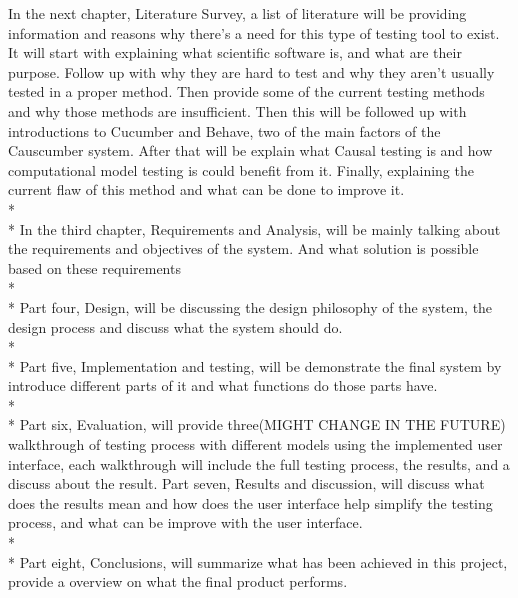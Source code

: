 In the next chapter, Literature Survey, a list of literature will be providing information and reasons why there’s a need for this type of testing tool to exist. It will start with explaining what scientific software is, and what are their purpose. Follow up with why they are hard to test and why they aren’t usually tested in a proper method. Then provide some of the current testing methods and why those methods are insufficient. Then this will be followed up with introductions to Cucumber and Behave, two of the main factors of the Causcumber system. After that will be explain what Causal testing is and how computational model testing is could benefit from it. Finally, explaining the current flaw of this method and what can be done to improve it.\\* \\* 
In the third chapter, Requirements and Analysis, will be mainly talking about the requirements and objectives of the system. And what solution is possible based on these requirements\\* \\*
Part four, Design, will be discussing the design philosophy of the system, the design process and discuss what the system should do. \\* \\*
Part five, Implementation and testing, will be demonstrate the final system by introduce different parts of it and what functions do those parts have. \\* \\*
Part six, Evaluation, will provide three(MIGHT CHANGE IN THE FUTURE) walkthrough of testing process with different models using the implemented user interface, each walkthrough will include the full testing process, the results, and a discuss about the result.
Part seven, Results and discussion, will discuss what does the results mean and how does the user interface help simplify the testing process, and what can be improve with the user interface.\\* \\*
Part eight, Conclusions, will summarize what has been achieved in this project, provide a overview on what the final product performs.






